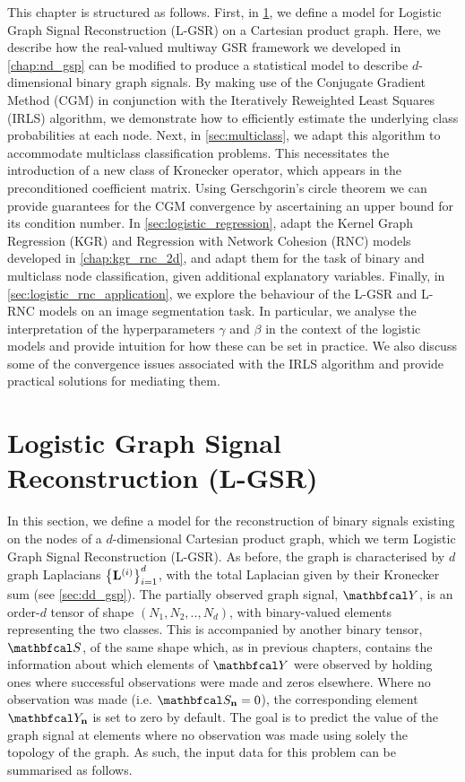 This chapter is structured as follows. First, in \cref{sec:lgsr}, we define a model for Logistic Graph Signal Reconstruction (L-GSR) on a Cartesian product graph. Here, we describe how the real-valued multiway GSR framework we developed in \cref{chap:nd_gsp} can be modified to produce a statistical model to describe $d$-dimensional binary graph signals. By making use of the Conjugate Gradient Method (CGM) in conjunction with the Iteratively Reweighted Least Squares (IRLS) algorithm, we demonstrate how to efficiently estimate the underlying class probabilities at each node. Next, in \cref{sec:multiclass}, we adapt this algorithm to accommodate multiclass classification problems. This necessitates the introduction of a new class of Kronecker operator, which appears in the preconditioned coefficient matrix. Using Gerschgorin's circle theorem we can provide guarantees for the CGM convergence by ascertaining an upper bound for its condition number. In \cref{sec:logistic_regression}, adapt the Kernel Graph Regression (KGR) and Regression with Network Cohesion (RNC) models developed in \cref{chap:kgr_rnc_2d}, and adapt them for the task of binary and multiclass node classification, given additional explanatory variables. Finally, in \cref{sec:logistic_rnc_application}, we explore the behaviour of the L-GSR and L-RNC models on an image segmentation task. In particular, we analyse the interpretation of the hyperparameters $\gamma$ and $\beta$ in the context of the logistic models and provide intuition for how these can be set in practice. We also discuss some of the convergence issues associated with the IRLS algorithm and provide practical solutions for mediating them. 


\section{Logistic Graph Signal Reconstruction (L-GSR)}

\label{sec:lgsr}

In this section, we define a model for the reconstruction of binary signals existing on the nodes of a $d$-dimensional Cartesian product graph, which we term Logistic Graph Signal Reconstruction (L-GSR). As before, the graph is characterised by $d$ graph Laplacians $\left\{\mathbf{L}^{(i)}\right\}_{i=1}^d$, with the total Laplacian given by their Kronecker sum (see \cref{sec:dd_gsp}). The partially observed graph signal, $\Yt$, is an order-$d$ tensor of shape $(N_1, N_2, .., N_d)$, with binary-valued elements representing the two classes. This is accompanied by another binary tensor, $\St$, of the same shape which, as in previous chapters, contains the information about which elements of $\Yt$ were observed by holding ones where successful observations were made and zeros elsewhere. Where no observation was made (i.e. $\St_{\nn} = 0$), the corresponding element $\Yt_{\nn}$ is set to zero by default. The goal is to predict the value of the graph signal at elements where no observation was made using solely the topology of the graph. As such, the input data for this problem can be summarised as follows. 

